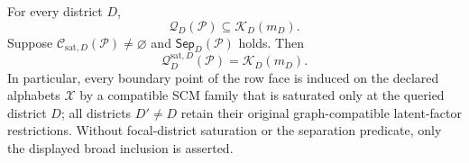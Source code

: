 For every district \(D\),
\[
\mathcal Q_D(\mathcal P)\subseteq\mathcal K_D(m_D).
\]
Suppose \(\mathcal C_{\mathrm{sat},D}(\mathcal P)\ne\varnothing\) and \(\mathsf{Sep}_D(\mathcal P)\) holds. Then
\[
\mathcal Q_D^{\mathrm{sat},D}(\mathcal P)=\mathcal K_D(m_D).
\]
In particular, every boundary point of the row face is induced on the declared alphabets \(\mathcal X\) by a compatible SCM family that is saturated only at the queried district \(D\); all districts \(D'\ne D\) retain their original graph-compatible latent-factor restrictions. Without focal-district saturation or the separation predicate, only the displayed broad inclusion is asserted.